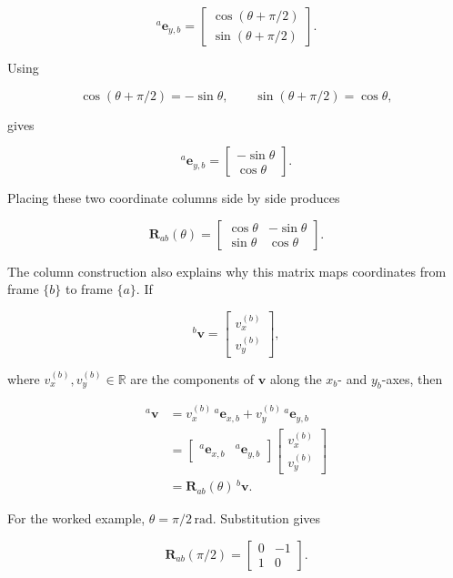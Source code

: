 \documentclass[
  australian,
  12pt,
  letterpaper,
  DIV=11,
  numbers=noendperiod,
  twoside]{scrreprt}
\begin{document}
\[
{}^{a}\mathbf e_{y,b}
=
\begin{bmatrix}
\cos(\theta+\pi/2)\\
\sin(\theta+\pi/2)
\end{bmatrix}.
\]

Using

\[
\cos(\theta+\pi/2)=-\sin\theta,
\qquad
\sin(\theta+\pi/2)=\cos\theta,
\]

gives

\[
{}^{a}\mathbf e_{y,b}
=
\begin{bmatrix}
-\sin\theta\\
\cos\theta
\end{bmatrix}.
\]

Placing these two coordinate columns side by side produces

\[
\boxed{
\mathbf R_{ab}(\theta)
=
\begin{bmatrix}
\cos\theta&-\sin\theta\\
\sin\theta&\cos\theta
\end{bmatrix}
}.
\]

The column construction also explains why this matrix maps coordinates
from frame \(\{b\}\) to frame \(\{a\}\). If

\[
{}^{b}\mathbf v
=
\begin{bmatrix}
v_x^{(b)}\\
v_y^{(b)}
\end{bmatrix},
\]

where \(v_x^{(b)},v_y^{(b)}\in\mathbb R\) are the components of
\(\mathbf v\) along the \(x_b\)- and \(y_b\)-axes, then

\[
\begin{aligned}
{}^{a}\mathbf v
&=v_x^{(b)}\,{}^{a}\mathbf e_{x,b}
+v_y^{(b)}\,{}^{a}\mathbf e_{y,b}\\
&=
\begin{bmatrix}
{}^{a}\mathbf e_{x,b}&{}^{a}\mathbf e_{y,b}
\end{bmatrix}
\begin{bmatrix}
v_x^{(b)}\\
v_y^{(b)}
\end{bmatrix}\\
&=\mathbf R_{ab}(\theta)\,{}^{b}\mathbf v.
\end{aligned}
\]

For the worked example, \(\theta=\pi/2\,\mathrm{rad}\). Substitution
gives

\[
\mathbf R_{ab}(\pi/2)
=
\begin{bmatrix}
0&-1\\
1&0
\end{bmatrix}.
\]
\end{document}
